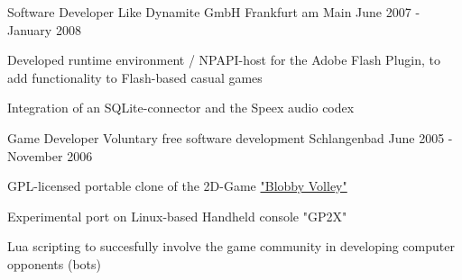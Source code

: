 \begin{cventries}
  \cventry
    {Software Developer} %
    {Like Dynamite GmbH} %
    {Frankfurt am Main} %
    {June 2007 - January 2008} %
    {
      \begin{cvitems} %
        \item {Developed runtime environment / NPAPI-host for the Adobe Flash Plugin, to add functionality to Flash-based casual games}
        \item {Integration of an SQLite-connector and the Speex audio codex}
      \end{cvitems}
    }

    \cventry
    {Game Developer} %
    {Voluntary free software development} %
    {Schlangenbad} %
    {June 2005 - November 2006} %
    {
      \begin{cvitems} %
        \item {GPL-licensed portable clone of the 2D-Game \href{https://de.wikipedia.org/wiki/Blobby_Volley\#Blobby_Volley_2}{"Blobby Volley"} \acvHeaderIconSep \faWikipediaW}
        \item {Experimental port on Linux-based Handheld console "GP2X"}
        \item {Lua scripting to succesfully involve the game community in developing computer opponents (bots)}
      \end{cvitems}
    }

\end{cventries}
